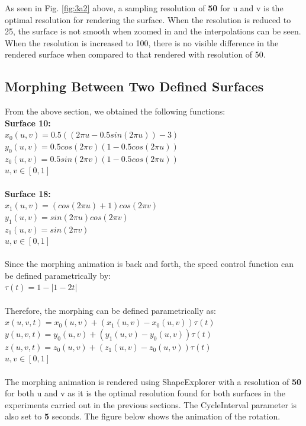 \documentclass[acmlarge,nonacm=true]{acmart}
\begin{document}
As seen in Fig. \ref{fig:3a2} above, a sampling resolution of \textbf{50} for u and v is the optimal 
resolution for rendering the surface. When the resolution is reduced to 25, the surface is not smooth
when zoomed in and the interpolations can be seen. When the resolution is increased to 100, there is no visible difference 
in the rendered surface when compared to that rendered with resolution of 50.

\newpage
\subsection{Morphing Between Two Defined Surfaces}
From the above section, we obtained the following functions:\\
\textbf{Surface 10:}\\
$x_0(u,v) = 0.5((2\pi u-0.5sin(2\pi u))-3)$\\
$y_0(u,v) = 0.5cos(2\pi v)(1-0.5cos(2\pi u))$\\
$z_0(u,v) = 0.5sin(2\pi v)(1-0.5cos(2\pi u))$\\
$u,v \in [0,1]$\\\\
\textbf{Surface 18:}\\
$x_1(u,v) = (cos(2\pi u) + 1)cos(2\pi v)$\\
$y_1(u,v) = sin(2\pi u)cos(2\pi v)$\\
$z_1(u,v) = sin(2\pi v)$\\
$u,v\in[0,1]$\\\\
Since the morphing animation is back and forth, the speed control function
can be defined parametrically by:\\
$\tau(t) = 1 - |1 - 2t|$\\\\
Therefore, the morphing can be defined parametrically as:\\
$x(u,v,t) = x_0(u,v) + (x_1(u,v) - x_0(u,v))\tau(t)$\\
$y(u,v,t) = y_0(u,v) + (y_1(u,v) - y_0(u,v))\tau(t)$\\
$z(u,v,t) = z_0(u,v) + (z_1(u,v) - z_0(u,v))\tau(t)$\\
$u,v\in[0,1]$\\\\
The morphing animation is rendered using ShapeExplorer with a resolution of \textbf{50}
for both u and v as it is the optimal resolution found for both surfaces in the experiments
carried out in the previous sections. The CycleInterval parameter is also set to \textbf{5} 
seconds. The figure below shows the animation of the rotation.
\end{document}
